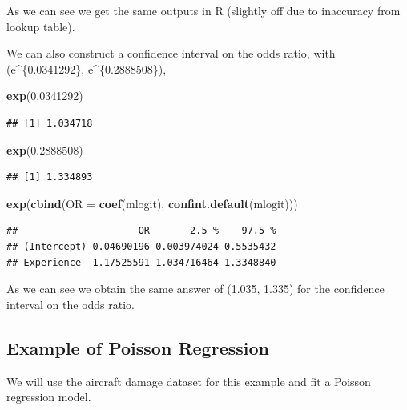 \documentclass[
  11pt,
]{article}
\newenvironment{Shaded}{\begin{snugshade}}{\end{snugshade}}
\newcommand{\AttributeTok}[1]{\textcolor[rgb]{0.13,0.29,0.53}{#1}}
\newcommand{\FloatTok}[1]{\textcolor[rgb]{0.00,0.00,0.81}{#1}}
\newcommand{\FunctionTok}[1]{\textcolor[rgb]{0.13,0.29,0.53}{\textbf{#1}}}
\newcommand{\NormalTok}[1]{#1}
\begin{document}
As we can see we get the same outputs in R (slightly off due to
inaccuracy from lookup table).

We can also construct a confidence interval on the odds ratio, with
(e\^{}\{0.0341292\}, e\^{}\{0.2888508\}),

\begin{Shaded}
\begin{Highlighting}[]
\FunctionTok{exp}\NormalTok{(}\FloatTok{0.0341292}\NormalTok{)}
\end{Highlighting}
\end{Shaded}

\begin{verbatim}
## [1] 1.034718
\end{verbatim}

\begin{Shaded}
\begin{Highlighting}[]
\FunctionTok{exp}\NormalTok{(}\FloatTok{0.2888508}\NormalTok{)}
\end{Highlighting}
\end{Shaded}

\begin{verbatim}
## [1] 1.334893
\end{verbatim}

\begin{Shaded}
\begin{Highlighting}[]
\FunctionTok{exp}\NormalTok{(}\FunctionTok{cbind}\NormalTok{(}\AttributeTok{OR =} \FunctionTok{coef}\NormalTok{(mlogit), }\FunctionTok{confint.default}\NormalTok{(mlogit)))}
\end{Highlighting}
\end{Shaded}

\begin{verbatim}
##                     OR       2.5 %    97.5 %
## (Intercept) 0.04690196 0.003974024 0.5535432
## Experience  1.17525591 1.034716464 1.3348840
\end{verbatim}

As we can see we obtain the same answer of (1.035, 1.335) for the
confidence interval on the odds ratio.

\subsection{Example of Poisson
Regression}\label{example-of-poisson-regression}

We will use the aircraft damage dataset for this example and fit a
Poisson regression model.
\end{document}
